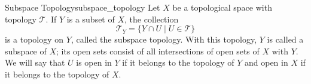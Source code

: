 \begin{definition}
{Subspace Topology}{subspace_topology}
    Let \(X\) be a topological space with topology \(\mathcal{T}\). If \(Y\) is a subset of \(X\), the collection
    \[
    \mathcal{T}_{Y} = \{Y \cap U \mid U \in \mathcal{T}\}
    \]
    is a topology on \(Y\), called the subspace topology. With this topology,
    \(Y\) is called a subspace of \(X\); its open sets consist of all
    intersections of open sets of \(X\) with \(Y\). We will say that \( U \) is
    open in \( Y \) if it belongs to the topology of \( Y \) and open in \( X \)
    if it belongs to the topology of \( X \).
\end{definition}
